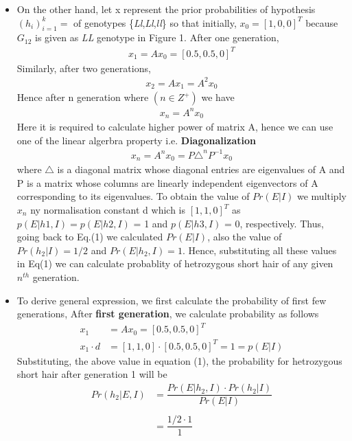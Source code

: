 \documentclass{article}
\begin{document}
\begin{itemize}
    \item On the other hand, let x represent the prior probabilities of hypothesis {$ (h_{i})^{k}_{i=1} =$} of genotypes \{\textit{Ll},\textit{Ll},\textit{ll}\} so that initially, $ x_0 = [1, 0, 0]^T $ because $ G_{12} $ is given as \textit{LL} genotype in Figure 1. After one generation,
    \begin{align*}
    x_1 = Ax_0 = [0.5, 0.5, 0]^T 
    \end{align*}
     Similarly, after two generations, 
    \begin{align*}
    x_2 = Ax_1 = A^2x_0 
    \end{align*}
    Hence after n generation where $ (n\in Z^+) $ we have 
    \begin{align*}
    x_n  = A^nx_0 
    \end{align*}
    Here it is required to calculate higher power of matrix A, hence we can use one of the linear algerbra property i.e. \textbf{Diagonalization}
    \begin{align*}
    x_n  = A^nx_0 = P\triangle^{n}P^{-1}x_0 
    \end{align*}	
    where $ \triangle $ is a diagonal matrix whose diagonal entries are eigenvalues of A and P is a matrix whose columns are linearly independent eigenvectors of A corresponding to its eigenvalues. To obtain the value of $ Pr(E|I) $ we multiply $ x_n $ ny normalisation constant d which is $ [1,1,0]^T $ as $ p(E|h1, I) = p(E|h2, I) $ = 1 and $ p(E|h3, I) $ = 0, respectively. Thus, going back to Eq.(1) we calculated $ Pr(E|I) $, also the value of $ Pr(h_2|I) = 1/2 $ and $ Pr(E|h_2,I) = 1 $. Hence, substituting all these values in Eq(1) we can calculate probablity of hetrozygous short hair of any given $ n^{th} $ generation.
    \item To derive general expression, we first calculate the probability of first few generations,
    After \textbf{first generation}, we calculate probability as follows
    \begin{align*}
    x_1 &= Ax_0 = [0.5, 0.5, 0]^T\\
    x_1 \cdot d &=  [1, 1, 0]\cdot[0.5, 0.5, 0]^T = 1 = p(E|I) 
    \end{align*}
    Substituting, the above value in equation (1), the probability for hetrozygous short hair after generation 1 will be
    \begin{align*}
    Pr(h_2|E,I) &= \dfrac{Pr(E|h_2,I)\cdot Pr(h_2|I)}{Pr(E|I)}\\\\
    &= \dfrac{1/2 \cdot 1}{1}\\

\end{align*}
\end{itemize}
\end{document}
